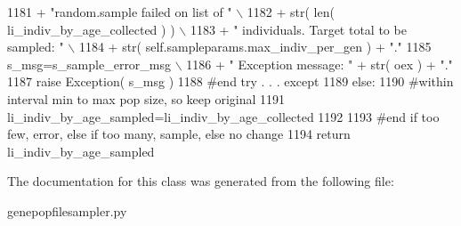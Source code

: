 \begin{DoxyCode}
1181                         + \textcolor{stringliteral}{"random.sample failed on list of "} \(\backslash\)
1182                         + str( len( li\_indiv\_by\_age\_collected ) ) \(\backslash\)
1183                         + \textcolor{stringliteral}{" individuals.  Target total to be sampled: "} \(\backslash\)
1184                         + str( self.sampleparams.max\_indiv\_per\_gen ) + \textcolor{stringliteral}{"."}
1185                 s\_msg=s\_sample\_error\_msg \(\backslash\)
1186                         + \textcolor{stringliteral}{"  Exception message: "} + str( oex ) + \textcolor{stringliteral}{"."}
1187                 \textcolor{keywordflow}{raise} Exception( s\_msg )
1188             \textcolor{comment}{#end try . . . except}
1189         \textcolor{keywordflow}{else}:
1190             \textcolor{comment}{#within interval min to max pop size, so keep original }
1191             li\_indiv\_by\_age\_sampled=li\_indiv\_by\_age\_collected
1192 
1193         \textcolor{comment}{#end if too few, error, else if too many, sample, else no change}
1194         \textcolor{keywordflow}{return} li\_indiv\_by\_age\_sampled
\end{DoxyCode}


The documentation for this class was generated from the following file\+:\begin{DoxyCompactItemize}
\item 
genepopfilesampler.\+py\end{DoxyCompactItemize}
